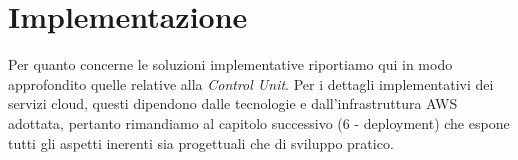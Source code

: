 
\section{Implementazione}\label{sec:implementazione}
Per quanto concerne le soluzioni implementative riportiamo qui in modo approfondito quelle relative alla \textit{Control Unit}.
Per i dettagli implementativi dei servizi cloud, questi dipendono dalle tecnologie e dall'infrastruttura AWS adottata, pertanto rimandiamo al capitolo successivo (6 - deployment) che espone tutti gli aspetti inerenti sia progettuali che di sviluppo pratico.

